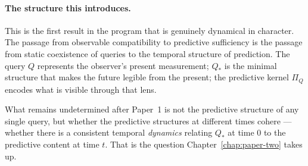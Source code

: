 \medskip

\paragraph{The structure this introduces.}
This is the first result in the program that is genuinely dynamical in
character.  The passage from observable compatibility to predictive
sufficiency is the passage from static coexistence of queries to the
temporal structure of prediction.  The query $Q$ represents the observer's
present measurement; $Q_*$ is the minimal structure that makes the future
legible from the present; the predictive kernel $\Pi_Q$ encodes what is
visible through that lens.

What remains undetermined after Paper~1 is not the predictive structure
of any single query, but whether the predictive structures at different
times cohere --- whether there is a consistent temporal \emph{dynamics}
relating $Q_*$ at time $0$ to the predictive content at time $t$.
That is the question Chapter~\ref{chap:paper-two} takes up.
